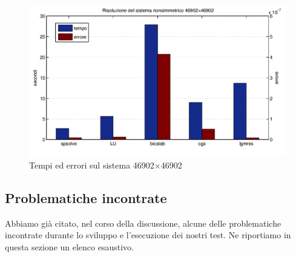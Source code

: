 \documentclass[11pt,a4paper]{scrartcl}
\begin{document}
\begin{figure}[!ht]
\centering
\includegraphics[scale=0.50]{images/confronto} 
\caption{Tempi ed errori sul sistema 46902$\times$46902}
\label{confronto}
\end{figure}

\newpage
\subsection*{Problematiche incontrate}
Abbiamo già citato, nel corso della discussione, alcune delle problematiche incontrate durante lo sviluppo e l'esecuzione dei nostri test. Ne riportiamo in questa sezione un elenco esaustivo.
\end{document}
